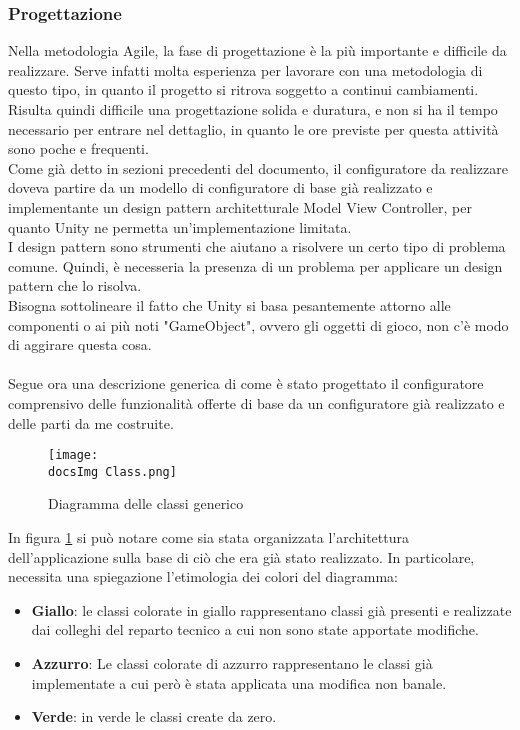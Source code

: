 \subsubsection{Progettazione}
Nella metodologia Agile, la fase di progettazione \`e la pi\`u importante e difficile da realizzare. Serve infatti molta esperienza per lavorare con una metodologia di questo tipo, in quanto il progetto si ritrova soggetto a continui cambiamenti. Risulta quindi difficile una progettazione solida e duratura, e non si ha il tempo necessario per entrare nel dettaglio, in quanto le ore previste per questa attivit\`a sono poche e frequenti.\\
Come gi\`a detto in sezioni precedenti del documento, il configuratore da realizzare doveva partire da un modello di configuratore di base gi\`a realizzato e implementante un design pattern architetturale Model View Controller, per quanto Unity ne permetta un'implementazione limitata.\\
I design pattern sono strumenti che aiutano a risolvere un certo tipo di problema comune. Quindi, \`e necesseria la presenza di un problema per applicare un design pattern che lo risolva.\\
Bisogna sottolineare il fatto che Unity si basa pesantemente attorno alle componenti o ai pi\`u noti "GameObject", ovvero gli oggetti di gioco, non c'\`e modo di aggirare questa cosa.\\\\
Segue ora una descrizione generica di come \`e stato progettato il configuratore comprensivo delle funzionalit\`a offerte di base da un configuratore gi\`a realizzato e delle parti da me costruite.\\


\begin{figure}[H]
	\centering
	\texttt{[image: \\docsImg Class.png]}
	\caption{Diagramma delle classi generico}
	\label{fig:Diagramma delle classi generico}
\end{figure}
\newpage

In figura \ref{fig:Diagramma delle classi generico} si pu\`o notare come sia stata organizzata l'architettura dell'applicazione sulla base di ci\`o che era gi\`a stato realizzato. In particolare, necessita una spiegazione l'etimologia dei colori del diagramma:

\begin{itemize}
	\item \textbf{Giallo}: le classi colorate in giallo rappresentano classi gi\`a presenti e realizzate dai colleghi del reparto tecnico a cui non sono state apportate modifiche.
	\item \textbf{Azzurro}: Le classi colorate di azzurro rappresentano le classi gi\`a implementate a cui per\`o \`e stata applicata una modifica non banale.
	\item \textbf{Verde}: in verde le classi create da zero.
\end{itemize}

